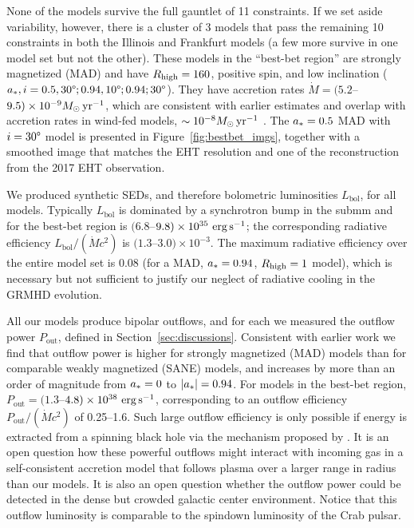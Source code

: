 None of the \fiducial models survive the full gauntlet of 11 constraints.
If we set aside variability, however, there is a cluster of 3 models that pass the remaining 10 constraints in both the Illinois and Frankfurt \fiducial models (a few more survive in one model set but not the other).
These models in the ``best-bet region'' are strongly magnetized (MAD) and have $R_\mathrm{high} = 160$, positive spin, and low inclination ($\abh, i = 0.5, 30\degree; 0.94, 10\degree; 0.94; 30\degree$).
They have accretion rates $\dot{M} = (5.2$--$9.5)\times 10^{-9}M_\odot\,\mathrm{yr}^{-1}$, which are consistent with earlier estimates and overlap with accretion rates in wind-fed models, $\sim 10^{-8} M_\odot\,\mathrm{yr}^{-1}$ \citep{2020ApJ...896L...6R}.
The $a_* = 0.5$ MAD with $i=30\degree$ model is presented in Figure~\ref{fig:bestbet_imgs}, together with a smoothed image that matches the EHT resolution and one of the reconstruction from the 2017 EHT observation.

We produced synthetic SEDs, and therefore bolometric luminosities $L_\mathrm{bol}$, for all \fiducial models.
Typically $L_\mathrm{bol}$ is dominated by a synchrotron bump in the submm and for the best-bet region is $(6.8$--$9.8)\times10^{35}\,\,\mathrm{erg}\,\mathrm{s}^{-1}$; the corresponding radiative efficiency $L_\mathrm{bol}/(\dot{M} c^2)$ is $(1.3$--$3.0)\times 10^{-3}$.
The maximum radiative efficiency over the entire \fiducial model set is 0.08 (for a MAD, $a_* = 0.94$, $R_\mathrm{high} = 1$ model), which is necessary but not sufficient to justify our neglect of radiative cooling in the GRMHD evolution.

All our models produce bipolar outflows, and for each we measured the outflow power $P_\mathrm{out}$, defined in Section~\ref{sec:discussions}.
Consistent with earlier work we find that outflow power is higher for strongly magnetized (MAD) models than for comparable weakly magnetized (SANE) models, and increases by more than an order of magnitude from $a_* = 0$ to $|a_*| = 0.94$.
For models in the best-bet region, $P_\mathrm{out} = (1.3$--$4.8) \times 10^{38}\,\,\mathrm{erg}\,\mathrm{s}^{-1}$, corresponding to an outflow efficiency $P_\mathrm{out} /(\dot{M} c^2)$ of 0.25--1.6.
Such large outflow efficiency is only possible if energy is extracted from a spinning black hole via the mechanism proposed by  \cite{1977MNRAS.179..433B}.
It is an open question how these powerful outflows might interact with incoming gas in a self-consistent accretion model that follows plasma over a larger range in radius than our \fiducial models.
It is also an open question whether the outflow power could be detected in the dense but crowded galactic center environment.
Notice that this outflow luminosity is comparable to the spindown luminosity of the Crab pulsar.

